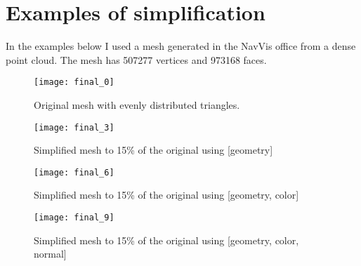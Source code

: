 \chapter{Examples of simplification}
\thispagestyle{empty}%

In the examples below I used a mesh generated in the NavVis office from a dense point cloud. The mesh has 507277 vertices and 973168 faces.

\begin{sidewaysfigure}[ht]
    \texttt{[image: final\_0]}
    \caption{Original mesh with evenly distributed triangles.}
    \label{fig:final_0}
\end{sidewaysfigure}

\newpage
\begin{sidewaysfigure}[ht]
    \texttt{[image: final\_3]}
    \caption{Simplified mesh to 15\% of the original using [geometry]}
    \label{fig:final_3}
\end{sidewaysfigure}

\newpage
\begin{sidewaysfigure}[ht]
    \texttt{[image: final\_6]}
    \caption{Simplified mesh to 15\% of the original using [geometry, color]}
    \label{fig:final_6}
\end{sidewaysfigure}

\newpage
\begin{sidewaysfigure}[ht]
    \texttt{[image: final\_9]}
    \caption{Simplified mesh to 15\% of the original using [geometry, color, normal]}
    \label{fig:final_9}
\end{sidewaysfigure}
